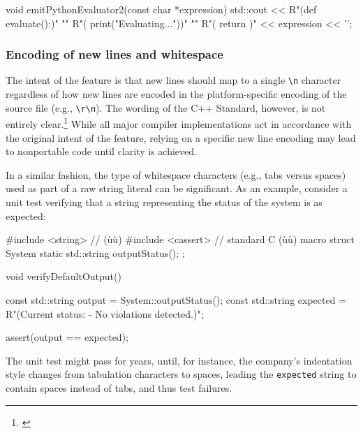 \begin{emcppslisting}[emcppsbatch=e4]
void emitPythonEvaluator2(const char *expression)
{
    std::cout <<
        R"(def evaluate():)"                 "\n"
        R"(    print("Evaluating..."))"      "\n"
        R"(    return )" << expression << '\n';
}
\end{emcppslisting}


\subsubsection[Encoding of new lines and whitespace]{Encoding of new lines and whitespace}\label{encoding-of-newlines-and-whitespace}

The intent of the feature is that new lines should map to a single
\lstinline!\n! character regardless of how new lines are encoded
in the platform-specific encoding of the source file (e.g., \lstinline!\r\n!). The wording of the C++ Standard, however, is not
entirely clear.\footnote{\cite{miller13}} While all major compiler
implementations act in accordance with the original intent of the
feature, relying on a specific new line encoding may lead to nonportable
code until clarity is achieved.

In a similar fashion, the type of whitespace characters (e.g., tabs
versus spaces) used as part of a raw string literal can be significant.
As an example, consider a unit test verifying that a string representing
the status of the system is as expected:

\newpage%
\begin{emcppshiddenlisting}[emcppsbatch=e5]
#include <string>   // (ù{}ù)
#include <cassert>  // standard C (ù{}ù) macro
struct System
{
    static std::string outputStatus();
};
\end{emcppshiddenlisting}
\begin{emcppslisting}[emcppsbatch=e5]
void verifyDefaultOutput()
{
    const std::string output = System::outputStatus();
    const std::string expected = R"(Current status:
    - No violations detected.)";

    assert(output == expected);
}
\end{emcppslisting}

\noindent The unit test might pass for years, until, for instance, the
company's indentation style changes from tabulation characters to
spaces, leading the \lstinline!expected! string to contain spaces instead of tabs, and thus test failures.


